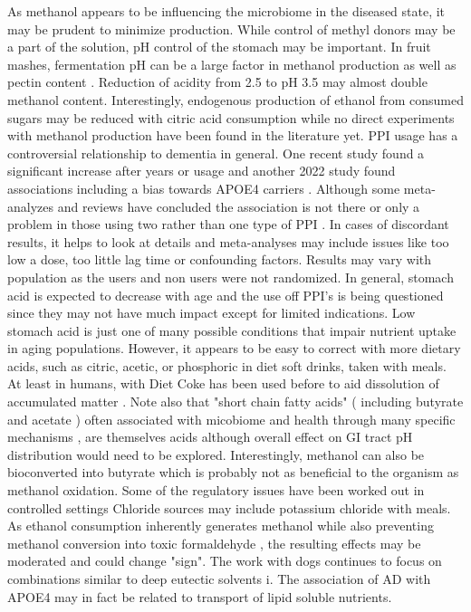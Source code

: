 \documentclass[aps,secnumarabic,balancelastpage,amsmath,amssymb,nofootinbib]{revtex4}
\begin{document}
As methanol appears to be influencing the microbiome in
the diseased state, it may be prudent to minimize production.
While control of methyl donors may be a part of the solution,
pH control of the stomach may be important. 
In fruit mashes, fermentation pH can be a large factor in methanol
production as well as pectin content 
\cite{Blumenthal_Steger_Einfalt_Methanol_Mitigation_during_Manufacturing_2021}.
Reduction of acidity from 2.5 to pH 3.5 may almost double
methanol content. 
Interestingly, endogenous production of ethanol from consumed
sugars may be reduced with citric acid consumption 
\cite{10.3389/fmicb.2016.00047} while no direct experiments
with methanol production have been found in the literature yet.
PPI usage has a controversial relationship to dementia
in general. 
One recent study found a significant increase after years or usage
\cite{Northuis10.1212/WNL.0000000000207747}
and another 2022 study found associations
including a  bias towards APOE4 carriers
\cite{Zhang_Li_Chen_Regular_proton_pump_inhibitor_2022}.
Although some meta-analyzes and reviews have concluded the association is
not there 
\cite{PMC10229084}
or only a problem in those using two rather than one type of PPI
\cite{TorresBondia_Dakterzada_Galvan_Proton_pump_inhibitors_2020}.
In cases of discordant results, it helps to look at details and meta-analyses
may include issues like too low a dose, too little lag time or 
confounding factors. Results may vary with population as the users and
non users were not randomized.
In general, stomach acid is expected to decrease with age
and the use off PPI's is being questioned 
\cite{Mehta_Guasch_Kamen_Proton_Pump_Inhibitors_2020} 
since they may not have much impact except for limited indications. 
Low stomach acid is just one of many possible conditions
that impair nutrient uptake in aging populations.
However, it appears to be easy to correct with more
dietary acids, such as citric, acetic, or phosphoric in diet
soft drinks, taken   with meals.
At least in humans, with Diet Coke has been used before
to aid dissolution of accumulated matter 
\cite{PMC3966177}.
Note also that "short chain fatty acids"
( including butyrate and acetate )  often associated
with micobiome and health
through many specific mechanisms \cite{PMC6382411}, 
are themselves acids
although overall effect on GI tract pH distribution would
need to be explored.
Interestingly, methanol can also be bioconverted into butyrate
\cite{Datta_Ogeltree_Methanol_bioconversion_1983} which
is probably not as beneficial to the organism as methanol
oxidation. Some of the regulatory issues have been
worked out in controlled settings  
\cite{PabloIvanNikel_Establishing_Butyribacterium_methylotrophicum_2022}
Chloride sources may include potassium chloride with meals.
As ethanol consumption inherently generates methanol
while also preventing methanol conversion into toxic
formaldehyde
\cite{Dorokhov_Shindyapina_Sheshukova_Metabolic_Methanol_Molecular_Pathways_2015}
, the resulting effects may be moderated and could change "sign".
The work with dogs continues to focus on combinations
similar to deep eutectic solvents i\cite{marchywka-MJM-2021-018-0.50rg}.
The association of AD with APOE4
may in fact be related to transport of lipid soluble
nutrients. 
\end{document}
